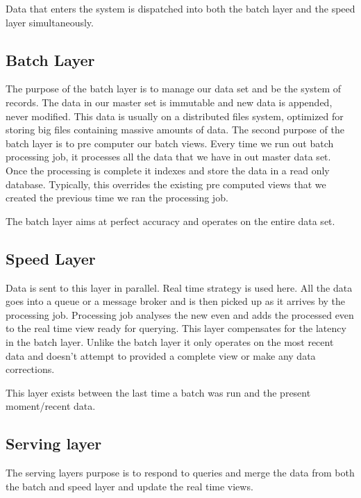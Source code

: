 \begin{note}
    Data that enters the system is dispatched into both the batch layer and the speed layer simultaneously.
\end{note}

\subsection{Batch Layer}
The purpose of the batch layer is to manage our data set and be the system of records.
The data in our master set is immutable and new data is appended, never modified.
This data is usually on a distributed files system, optimized for storing big files containing massive amounts of data.
The second purpose of the batch layer is to pre computer our batch views.
Every time we run out batch processing job, it processes all the data that we have in out master data set.
Once the processing is complete it indexes and store the data in a read only database.
Typically, this overrides the existing pre computed views that we created the previous time we ran the processing job.
\begin{note}
    The batch layer aims at perfect accuracy and operates on the entire data set.
\end{note}

\subsection{Speed Layer}
Data is sent to this layer in parallel.
Real time strategy is used here.
All the data goes into a queue or a message broker and is then picked up as it arrives by the processing job.
Processing job analyses the new even and adds the processed even to the real time view ready for querying.
This layer compensates for the latency in the batch layer.
Unlike the batch layer it only operates on the most recent data and doesn't attempt to provided a complete view or make any data corrections.

This layer exists between the last time a batch was run and the present moment/recent data.

\subsection{Serving layer}
The serving layers purpose is to respond to queries and merge the data from both the batch and speed layer and update the real time views.